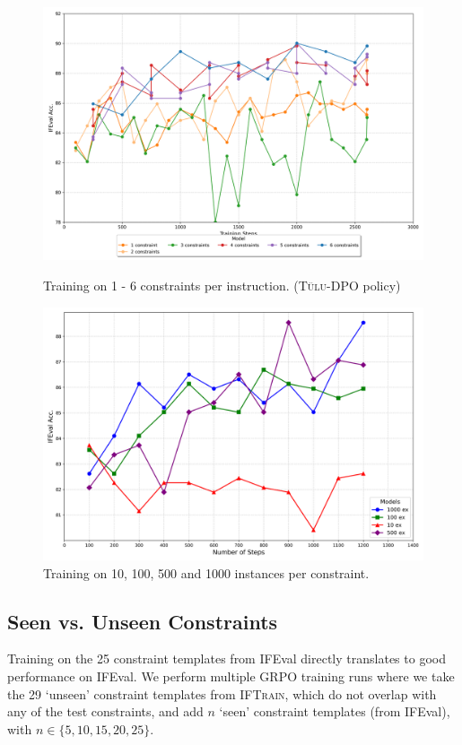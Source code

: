 \documentclass{article}
\newcommand{\trainname}{\textsc{IFTrain}\xspace}
\newcommand{\tulu}{\textsc{T\"ulu}\xspace}
\begin{document}
\begin{figure}
\centering
\begin{minipage}{.5\textwidth}
    \centering
    \includegraphics[width=\linewidth]
    {figures/combining_constraints.png}
         \caption{Training on 1 - 6 constraints per instruction. (\tulu-DPO policy)}
    \label{fig:combining_constraints}
\end{minipage}%
\begin{minipage}{.5\textwidth}
    \centering
    \includegraphics[width=\linewidth]{figures/instances.png}
        \caption{Training on 10, 100, 500 and 1000 instances per constraint.}

    \label{fig:instances}
\end{minipage}
\end{figure}



\subsection{Seen vs. Unseen Constraints}
Training on the 25 constraint templates from IFEval directly translates to good performance on IFEval. We perform multiple GRPO training runs where we take the 29 `unseen' constraint templates from \trainname, which do not overlap with any of the test constraints, and add $n$ `seen' constraint templates (from IFEval), with $n \in \{5, 10, 15, 20, 25\}$. 
\end{document}
